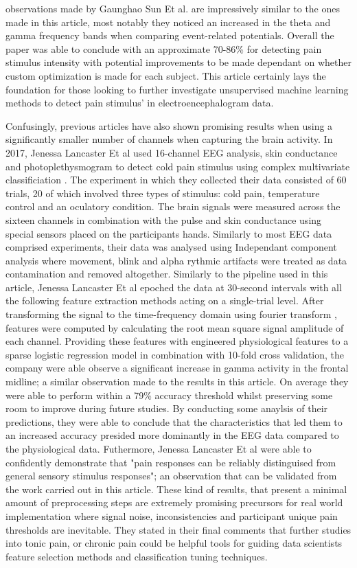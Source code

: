 \documentclass[11pt]{article}
\begin{document}
observations made by Gaunghao Sun Et al. are impressively similar to the ones made in this article, most notably they noticed an increased in the theta and gamma frequency bands when comparing event-related potentials. Overall the paper was able to conclude with an approximate 70-86\% for detecting pain stimulus intensity with potential improvements to be made dependant on whether custom optimization is made for each subject. This article certainly lays the foundation for those looking to further investigate unsupervised machine learning methods to detect pain stimulus' in electroencephalogram data.  

Confusingly, previous articles have also shown promising results when using a significantly smaller number of channels when capturing the brain activity. In 2017, Jenessa Lancaster Et al used 16-channel EEG analysis, skin conductance and photoplethysmogram to detect cold pain stimulus using complex multivariate classificiation \cite{8008404}. The experiment in which they collected their data consisted of 60 trials, 20 of which involved three types of stimulus: cold pain, temperature control and an oculatory condition. The brain signals were measured across the sixteen channels in combination with the pulse and skin conductance using special sensors placed on the participants hands. Similarly to most EEG data comprised experiments, their data was analysed using Independant component analysis where movement, blink and alpha rythmic artifacts were treated as data contamination and removed altogether. Similarly to the pipeline used in this article, Jenessa Lancaster Et al epoched the data at 30-second intervals with all the following feature extraction methods acting on a single-trial level. After transforming the signal to the time-frequency domain using fourier transform \cite{bracewell1986fourier}, features were computed by calculating the root mean square signal amplitude of each channel. Providing these features with engineered physiological features to a sparse logistic regression model in combination with 10-fold cross validation, the company were able observe a significant increase in gamma activity in the frontal midline; a similar observation made to the results in this article. On average they were able to perform within a 79\% accuracy threshold whilst preserving some room to improve during future studies. By conducting some anaylsis of their predictions, they were able to conclude that the characteristics that led them to an increased accuracy presided more dominantly in the EEG data compared to the physiological data. Futhermore, Jenessa Lancaster Et al were able to confidently demonstrate that "pain responses can be reliably distinguised from general sensory stimulus responses"; an observation that can be validated from the work carried out in this article. These kind of results, that present a minimal amount of preprocessing steps are extremely promising precursors for real world implementation where signal noise, inconsistencies and participant unique pain thresholds are inevitable. They stated in their final comments that further studies into tonic pain, or chronic pain could be helpful tools for guiding data scientists feature selection methods and classification tuning techniques.
\end{document}
